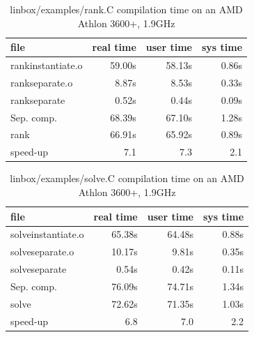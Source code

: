 \documentclass[runningheads,a4paper]{llncs}
\begin{document}
\begin{table}[ht]
\begin{tabular}{|l||r|r|r|}
\hline
file			& real time & user time & sys time\\
\hline
\hline
rankinstantiate.o 	& 59.00s & 58.13s & 0.86s\\
rankseparate.o 		&  8.87s &  8.53s & 0.33s\\
rankseparate 		&  0.52s &  0.44s & 0.09s\\
\hline
Sep. comp.		& 68.39s & 67.10s & 1.28s\\
\hline
rank 			& 66.91s & 65.92s & 0.89s\\
\hline
speed-up		& 7.1 & 7.3 & 2.1 \\
\hline
\end{tabular} 
\caption{linbox/examples/rank.C compilation time on an AMD Athlon
  3600+, 1.9GHz}\label{tab:compsolve}
\end{table}

\begin{table}[ht]
\begin{tabular}{|l||r|r|r|}
\hline
file			& real time & user time & sys time\\
\hline
\hline
solveinstantiate.o 	& 65.38s & 64.48s & 0.88s\\
solveseparate.o 	& 10.17s &  9.81s & 0.35s\\
solveseparate 		&  0.54s &  0.42s & 0.11s\\
\hline
Sep. comp.		& 76.09s & 74.71s & 1.34s\\
\hline
solve 			& 72.62s & 71.35s & 1.03s\\
\hline
speed-up		& 6.8 & 7.0 & 2.2 \\
\hline
\end{tabular} 
\caption{linbox/examples/solve.C compilation time on an AMD Athlon
  3600+, 1.9GHz}\label{tab:compsolve}
\end{table}



 
\end{document}
